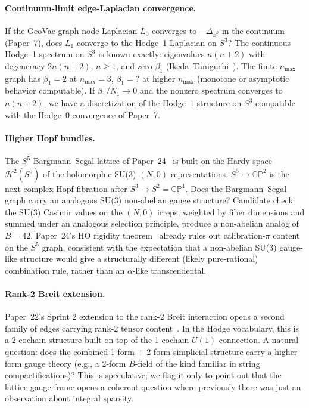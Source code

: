 \documentclass[aps,pra,twocolumn,superscriptaddress,longbibliography]{revtex4-2}
\begin{document}
\paragraph*{Continuum-limit edge-Laplacian convergence.} If the
GeoVac graph node Laplacian $L_0$ converges to $-\Delta_{S^3}$ in
the continuum (Paper~7), does $L_1$ converge to the
Hodge--1 Laplacian on $S^3$?  The continuous Hodge--1 spectrum on
$S^3$ is known exactly: eigenvalues $n(n+2)$ with degeneracy
$2n(n+2)$, $n \geq 1$, and zero $\beta_1$
(Ikeda--Taniguchi~\cite{IkedaTaniguchi1978}).  The finite-$n_{\max}$
graph has $\beta_1 = 2$ at $n_{\max} = 3$, $\beta_1 = ?$ at higher
$n_{\max}$ (monotone or asymptotic behavior computable).  If
$\beta_1 / N_1 \to 0$ and the nonzero spectrum converges to
$n(n+2)$, we have a discretization of the Hodge--1 structure on
$S^3$ compatible with the Hodge--0 convergence of Paper~7.

\paragraph*{Higher Hopf bundles.} The $S^5$ Bargmann--Segal lattice
of Paper~24~\cite{Paper24} is built on the Hardy space
$\mathcal{H}^2(S^5)$ of the holomorphic SU(3) $(N, 0)$
representations.  $S^5 \to \mathbb{CP}^2$ is the next complex Hopf
fibration after $S^3 \to S^2 = \mathbb{CP}^1$.  Does the
Bargmann--Segal graph carry an analogous SU(3) non-abelian gauge
structure?  Candidate check: the SU(3) Casimir values on the
$(N, 0)$ irreps, weighted by fiber dimensions and summed under an
analogous selection principle, produce a non-abelian analog of
$B = 42$.  Paper~24's HO rigidity theorem~\cite{Paper24} already
rules out calibration-$\pi$ content on the $S^5$ graph, consistent
with the expectation that a non-abelian SU(3) gauge-like structure
would give a structurally different (likely pure-rational)
combination rule, rather than an $\alpha$-like transcendental.

\paragraph*{Rank-2 Breit extension.} Paper~22's Sprint 2 extension
to the rank-2 Breit interaction opens a second family of edges
carrying rank-2 tensor content~\cite{Paper22}.  In the Hodge
vocabulary, this is a 2-cochain structure built on top of the
1-cochain $U(1)$ connection.  A natural question: does the combined
1-form + 2-form simplicial structure carry a higher-form gauge
theory (e.g., a 2-form $B$-field of the kind familiar in string
compactifications)?  This is speculative; we flag it only to point
out that the lattice-gauge frame opens a coherent question where
previously there was just an observation about integral sparsity.
\end{document}
